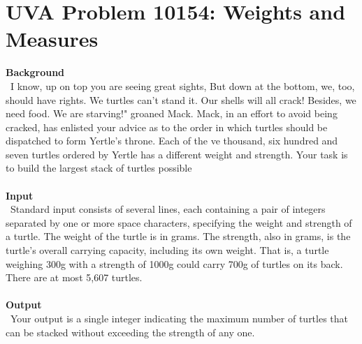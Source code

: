\documentclass[12pt]{article}
\begin{document}

\newcommand{\hmwkClass}{COS 255}
\newcommand{\hmwkSemester}{Spring 2016}

\newcommand{\hmwkAuthorName}{Lukas Leung}
\newcommand{\hmwkAuthorID}{lleung}

\newcommand{\hmwkAssignmentNum}{8}

\newcommand{\hmwkProblemNum}{0}

\newcommand{\hmwkCollaborators}{lab08}
\thispagestyle{fancycollab}


\section{UVA Problem 10154: Weights and Measures}
\textbf{Background} \\
~\indent I know, up on top you are seeing great sights,
But down at the bottom, we, too, should have rights.
We turtles can't stand it. Our shells will all crack!
Besides, we need food. We are starving!" groaned Mack.
Mack, in an effort to avoid being cracked, has enlisted your advice as to the order in which turtles
should be dispatched to form Yertle's throne. Each of the  ve thousand, six hundred and seven turtles
ordered by Yertle has a different weight and strength. Your task is to build the largest stack of turtles
possible \\ \\
\textbf{Input} \\
~\indent Standard input consists of several lines, each containing a pair of integers separated by one or more
space characters, specifying the weight and strength of a turtle. The weight of the turtle is in grams.
The strength, also in grams, is the turtle's overall carrying capacity, including its own weight. That is,
a turtle weighing 300g with a strength of 1000g could carry 700g of turtles on its back. There are at
most 5,607 turtles. \\ \\
\textbf{Output} \\
~\indent Your output is a single integer indicating the maximum number of turtles that can be stacked without
exceeding the strength of any one.
\end{document}
